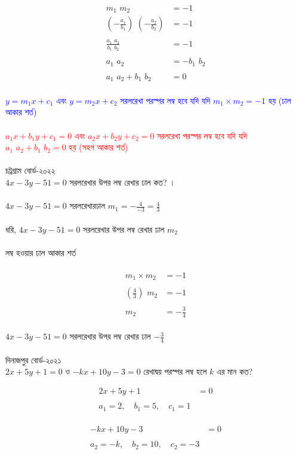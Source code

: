\documentclass{article}
\begin{document}
	\\
	\begin{align*}
	m_1\,\,m_2&=-1
		\\
	\left(	-\frac{a_1}{b_1}\right)\,\,\left(-\frac{a_2}{b_2}\right)&=-1\\
		\\
		\frac{a_1\,\,a_2}{b_1\,\,b_2}&=-1\\
		\\
		a_1\,\,a_2&=-b_1\,\,b_2\\
		\\
		a_1\,\,a_2+b_1\,\,b_2&=0
	\end{align*}
	\\
	\textcolor{blue}{	$y=m_1x+c_1$ এবং $y=m_2x+c_2$  সরলরেখা পরস্পর লম্ব  হবে যদি যদি $	m_1\times m_2=-1$ হয় (ঢাল আকার শর্ত) }\\
	\\
	\textcolor{red}{$a_1x+b_1y+c_1=0$ এবং 	$a_2x+b_2y+c_2=0$  সরলরেখা পরস্পর লম্ব  হবে যদি যদি $	a_1\,\,a_2+b_1\,\,b_2=0$ হয় (সহগ আকার শর্ত) }\\
	\\
	চট্রগ্রাম বোর্ড-২০২২\\ 
 $4x-3y-51=0$ সরলরেখার উপর লম্ব রেখার ঢাল কত? । \\ 
	\\
 $4x-3y-51=0$ সরলরেখারঢাল  $m_1=-\frac{4}{-3}=\frac{4}{3}$\\
	\\
 ধরি, $4x-3y-51=0$ সরলরেখার উপর লম্ব রেখার ঢাল   $m_2$\\
	\\
লম্ব হওয়ার ঢাল আকার শর্ত \\ 
	\\
	\begin{align*}
		m_1\times m_2&=-1\\
		\\
	\left(\frac{4}{3}\right)\,\,m_2&=-1\\
		\\
		m_2&=-\frac{3}{4}
	\end{align*}
	\\
	$4x-3y-51=0$ সরলরেখার উপর লম্ব রেখার ঢাল   $-\frac{3}{4}$ \\
	\\ 
	দিনাজপুর  বোর্ড-২০২১\\
	$2x+5y+1=0$	ও $-kx+10y-3=0$ রেখাদ্বয় পরস্পর লম্ব হলে $k$ এর  মান কত? \\
	\begin{multicols}{2}
		\begin{align*}
		2x+5y+1&=0\\
			\\
			a_1=2,\quad b_1=5,\quad c_1=1
		\end{align*}
		\\
		\begin{align*}
		-kx+10y-3&=0\\
			\\
			a_2=-k,\quad b_2=10,\quad c_2=-3
		\end{align*}
	\end{multicols}
\end{document}
